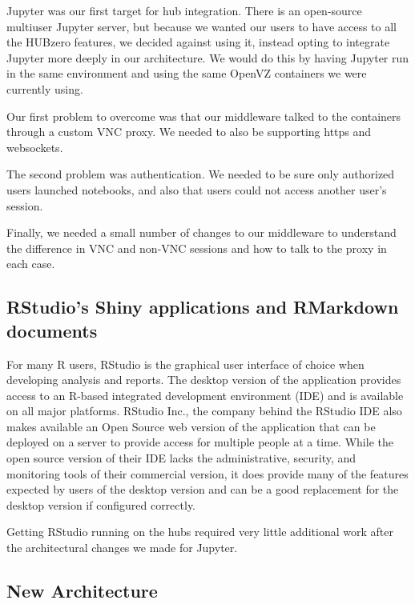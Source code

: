 \documentclass[conference]{../sty/IEEEtran}
\begin{document}
Jupyter was our first target for hub integration. There is an open-source multiuser Jupyter server, but because we wanted our users to have access to all the HUBzero features, we decided against using it, instead opting to integrate Jupyter more deeply in our architecture. We would do this by having Jupyter run in the same environment and using the same OpenVZ containers we were currently using.  

Our first problem to overcome was that our middleware talked to the containers through a custom VNC proxy.  We needed to also be supporting https and websockets.  

The second problem was authentication.  We needed to be sure only authorized users launched notebooks, and also that users could not access another user's session.

Finally, we needed a small number of changes to our middleware to understand the difference in VNC and non-VNC sessions and how to talk to the proxy in each case.



\subsection {RStudio's Shiny applications and RMarkdown documents}

For many R users, RStudio is the graphical user interface of choice when
developing analysis and reports. The desktop version of the application
provides access to an R-based integrated development environment (IDE) and is
available on all major platforms. RStudio Inc., the company behind the RStudio
IDE also makes available an Open Source web version of the application that can
be deployed on a server to provide access for multiple people at a time. While
the open source version of their IDE lacks the administrative, security, and
monitoring tools of their commercial version, it does provide many of the
features expected by users of the desktop version and can be a good replacement
for the desktop version if configured correctly.

Getting RStudio running on the hubs required very little additional work after 
the architectural changes we made for Jupyter.

\subsection {New Architecture}
\end{document}

